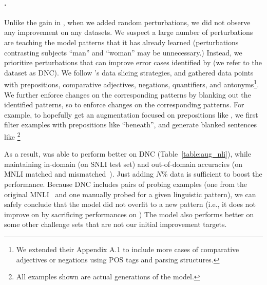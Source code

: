\paragraph{\nli.}
Unlike the gain in \sst, when we added random perturbations, we did not observe any improvement on any datasets.
We suspect a large number of perturbations are teaching the model patterns that it has already learned (\eg perturbations contrasting subjects ``man'' and ``woman'' may be unnecessary.) 
Instead, we prioritize perturbations that can improve error cases identified by \citet{kim2019probing} (we refer to the dataset as DNC).
We follow \citet{chen2019slice}'s data slicing strategies, and gathered data points with prepositions, comparative adjectives, negations, quantifiers, and antonyms\footnote{We extended their Appendix A.1 to include more cases of \eg comparative adjectives or negations using POS tags and parsing structures.}.
We further enforce changes on the corresponding patterns by blanking out the identified patterns, so to enforce changes on the corresponding patterns.
For example, to hopefully get an augmentation focused on prepositions like , we first filter examples with prepositions like ``beneath'', and generate blanked sentences like 
\footnote{All examples shown are actual generations of the model. }

As a result, \maug was able to perform better on DNC (Table~\ref{table:aug_nli}), while maintaining in-domain (on SNLI test set) and out-of-domain accuracies (on MNLI matched and mismatched~\cite{}).
Just adding $N\%$ data is sufficient to boost the performance.%
Because DNC includes pairs of probing examples (one from the original MNLI~\cite{} and one manually probed for a given linguistic pattern), we can safely conclude that the model did not overfit to a new pattern (i.e., it does not improve on  by sacrificing performances on )
The model also performs better on some other challenge sets that are not our initial improvement targets.

\TableAugQQP

